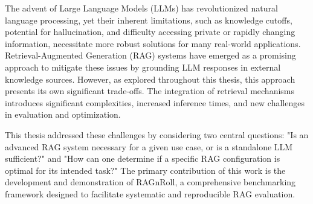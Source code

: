 The advent of Large Language Models (LLMs) has revolutionized natural language processing, yet their inherent limitations, such as knowledge cutoffs, potential for hallucination, and difficulty accessing private or rapidly changing information, necessitate more robust solutions for many real-world applications. Retrieval-Augmented Generation (RAG) systems have emerged as a promising approach to mitigate these issues by grounding LLM responses in external knowledge sources. However, as explored throughout this thesis, this approach presents its own significant trade-offs. The integration of retrieval mechanisms introduces significant complexities, increased inference times, and new challenges in evaluation and optimization.

This thesis addressed these challenges by considering two central questions: "Is an advanced RAG system necessary for a given use case, or is a standalone LLM sufficient?" and "How can one determine if a specific RAG configuration is optimal for its intended task?" The primary contribution of this work is the development and demonstration of RAGnRoll, a comprehensive benchmarking framework designed to facilitate systematic and reproducible RAG evaluation.

